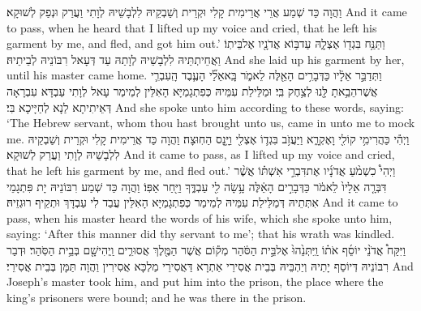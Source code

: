 {וַהֲוָה כַּד שְׁמַע אֲרֵי אֲרֵימִית קָלִי וּקְרֵית וְשַׁבְקֵיהּ לִלְבָשֵׁיהּ לְוָתִי וַעֲרַק וּנְפַק לְשׁוּקָא׃}
{And it came to pass, when he heard that I lifted up my voice and cried, that he left his garment by me, and fled, and got him out.’}{}
{וַתַּנַּ֥ח בִּגְד֖וֹ אֶצְלָ֑הּ עַד\maqqaf בּ֥וֹא אֲדֹנָ֖יו אֶל\maqqaf בֵּיתֽוֹ׃}
{וַאֲחֵיתְתֵּיהּ לִלְבָשֵׁיהּ לְוָתַהּ עַד דְּעָאל רִבּוֹנֵיהּ לְבֵיתֵיהּ׃}
{And she laid up his garment by her, until his master came home.}{}
{וַתְּדַבֵּ֣ר אֵלָ֔יו כַּדְּבָרִ֥ים הָאֵ֖לֶּה לֵאמֹ֑ר בָּֽא\maqqaf אֵלַ֞י הָעֶ֧בֶד הָֽעִבְרִ֛י אֲשֶׁר\maqqaf הֵבֵ֥אתָ לָּ֖נוּ לְצַ֥חֶק בִּֽי׃}
{וּמַלֵּילַת עִמֵּיהּ כְּפִתְגָמַיָּא הָאִלֵּין לְמֵימַר עָאל לְוָתִי עַבְדָּא עִבְרָאָה דְּאֵיתִיתָא לַנָא לְחַיָּיכָא בִּי׃}
{And she spoke unto him according to these words, saying: ‘The Hebrew servant, whom thou hast brought unto us, came in unto me to mock me.}{}
{וַיְהִ֕י כַּהֲרִימִ֥י קוֹלִ֖י וָאֶקְרָ֑א וַיַּעֲזֹ֥ב בִּגְד֛וֹ אֶצְלִ֖י וַיָּ֥נׇס הַחֽוּצָה׃}
{וַהֲוָה כַּד אֲרֵימִית קָלִי וּקְרֵית וְשַׁבְקֵיהּ לִלְבָשֵׁיהּ לְוָתִי וַעֲרַק לְשׁוּקָא׃}
{And it came to pass, as I lifted up my voice and cried, that he left his garment by me, and fled out.’}{}
{וַיְהִי֩ כִשְׁמֹ֨עַ אֲדֹנָ֜יו אֶת\maqqaf דִּבְרֵ֣י אִשְׁתּ֗וֹ אֲשֶׁ֨ר דִּבְּרָ֤ה אֵלָיו֙ לֵאמֹ֔ר כַּדְּבָרִ֣ים הָאֵ֔לֶּה עָ֥שָׂה לִ֖י עַבְדֶּ֑ךָ וַיִּ֖חַר אַפּֽוֹ׃}
{וַהֲוָה כַּד שְׁמַע רִבּוֹנֵיהּ יָת פִּתְגָמֵי אִתְּתֵיהּ דְּמַלֵּילַת עִמֵּיהּ לְמֵימַר כְּפִתְגָמַיָּא הָאִלֵּין עֲבַד לִי עַבְדָּךְ וּתְקֵיף רוּגְזֵיהּ׃}
{And it came to pass, when his master heard the words of his wife, which she spoke unto him, saying: ‘After this manner did thy servant to me’; that his wrath was kindled.}{}
{וַיִּקַּח֩ אֲדֹנֵ֨י יוֹסֵ֜ף אֹת֗וֹ וַֽיִּתְּנֵ֙הוּ֙ אֶל\maqqaf בֵּ֣ית הַסֹּ֔הַר מְק֕וֹם אֲשֶׁר\maqqaf {} הַמֶּ֖לֶךְ אֲסוּרִ֑ים וַֽיְהִי\maqqaf שָׁ֖ם בְּבֵ֥ית הַסֹּֽהַר׃}
{וּדְבַר רִבּוֹנֵיהּ דְּיוֹסֵף יָתֵיהּ וְיַהְבֵּיהּ בְּבֵית אֲסִירֵי אַתְרָא דַּאֲסִירֵי מַלְכָּא אֲסִירִין וַהֲוָה תַּמָּן בְּבֵית אֲסִירֵי׃}
{And Joseph’s master took him, and put him into the prison, the place where the king’s prisoners were bound; and he was there in the prison.}{}
